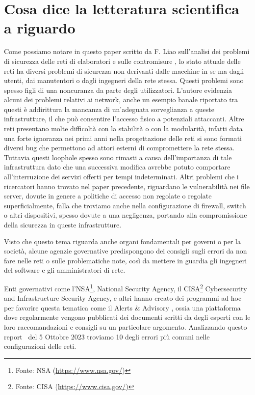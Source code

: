 \newpage
    \section{Cosa dice la letteratura scientifica a riguardo}
        Come possiamo notare in questo paper scritto da F. Liao sull'analisi dei 
        problemi di sicurezza delle reti di elaboratori e sulle contromisure 
        \cite{at_press_netw_sec}, lo stato attuale delle reti ha diversi problemi di sicurezza non derivanti dalle macchine in se ma dagli utenti, dai manutentori o dagli ingegneri della rete stessa. Questi problemi sono spesso figli di una noncuranza da parte degli utilizzatori.
        L'autore evidenzia alcuni dei problemi relativi ai network, anche un esempio banale riportato tra questi è addirittura la mancanza di un'adeguata sorveglianza a queste infrastrutture, il che può consentire l'accesso fisico a potenziali attaccanti.
        Altre reti presentano molte difficoltà con la stabilità o con la modularità, infatti data una forte ignoranza nei primi anni nella progettazione delle reti si sono formati diversi bug che permettono ad attori esterni di compromettere la rete stessa. Tuttavia questi loophole spesso sono rimasti a causa dell'importanza di tale infrastruttura dato che una successiva modifica avrebbe potuto comportare all'interruzione dei servizi offerti per tempi indeterminati.
        Altri problemi che i ricercatori hanno trovato nel paper precedente, riguardano le vulnerabilità nei file server, dovute in genere a politiche di accesso non regolate o regolate superficialmente, falla che troviamo anche nella configurazione di firewall, switch o altri dispositivi, spesso dovute a una negligenza, portando alla compromissione della sicurezza in queste infrastrutture.

        \vspace{3mm}

        Visto che questo tema riguarda anche organi fondamentali per governi o per la società, alcune agenzie governative predispongono dei consigli sugli errori da non fare nelle reti o sulle problematiche note, così da mettere in guardia gli ingegneri del software e gli amministratori di rete.
    
    \vspace{3mm}

       Enti governativi come l'NSA\footnote{Fonte: NSA (\url{https://www.nsa.gov/})}, National Security Agency, il CISA\footnote{Fonte: CISA (\url{https://www.cisa.gov/})} 
       Cybersecurity and Infrastructure Security Agency, e altri hanno creato dei programmi ad hoc per favorire questa tematica come il Alerts \& Advisory \cite{cisa2023}, ossia una piattaforma dove regolarmente vengono pubblicati dei documenti scritti da degli esperti con le loro raccomandazioni e consigli su un particolare argomento. Analizzando questo report~\cite{common_network_misconfiguration_cisa} del 5 Ottobre 2023 troviamo 10 degli errori più comuni nelle  configurazioni delle reti.
        
